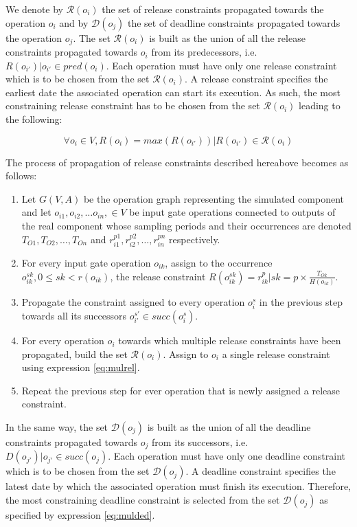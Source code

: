 We denote by $\mathcal{R}(o_i)$ the set of release constraints propagated towards the operation $o_i$ and by $\mathcal{D}(o_j)$ the set of deadline constraints propagated towards the operation $o_j$. The set $\mathcal{R}(o_i)$ is built as the union of all the release constraints propagated towards $o_i$ from its predecessors, i.e. $R(o_{i'}) | o_{i'} \in pred(o_i)$. Each operation must have only one release constraint which is to be chosen from the set $\mathcal{R}(o_i)$. A release constraint specifies the earliest date the associated operation can start its execution. As such, the most constraining release constraint has to be chosen from the set $\mathcal{R}(o_i)$ leading to the following:

\begin{equation}
\forall o_i \in V, R(o_i) = max(R(o_{i'})) | R(o_{i'}) \in \mathcal{R}(o_i)
\label{eq:mulrel}
\end{equation}

The process of propagation of release constraints described hereabove becomes as follows:

\begin{enumerate}
\item Let $G(V,A)$ be the operation graph representing the simulated component and let $o_{i1}, o_{i2}, \ldots o_{in},\in  V$ be input gate operations connected to outputs of the real component whose sampling periods and their occurrences are denoted $T_{O1}, T_{O2}, \ldots, T_{On}$ and $r_{i1}^{p1}, r_{i2}^{p2}, \ldots, r_{in}^{pn}$ respectively.
\item For every input gate operation $o_{ik}$, assign to the occurrence $o_{ik}^{sk}, 0 \leq sk < r(o_{ik})$, the release constraint $R(o_{ik}^{sk}) = r_{ik}^p | sk = p \times \frac{T_{Ok}}{H(o_{ik})}$.
\item Propagate the constraint assigned to every operation $o_i^s$ in the previous step towards all its successors $o_{i'}^{s'} \in succ(o_i^s)$.
\item For every operation $o_i$ towards which multiple release constraints have been propagated, build the set $\mathcal{R}(o_i)$. Assign to $o_i$ a single release constraint using expression \ref{eq:mulrel}.
\item Repeat the previous step for ever operation that is newly assigned a release constraint.
\end{enumerate}

In the same way, the set $\mathcal{D}(o_j)$ is built as the union of all the deadline constraints propagated towards $o_j$ from its successors, i.e. $D(o_{j'}) | o_{j'} \in succ(o_j)$. Each operation must have only one deadline constraint which is to be chosen from the set $\mathcal{D}(o_j)$. A deadline constraint specifies the latest date by which the associated operation must finish its execution. Therefore, the most constraining deadline constraint is selected from the set $\mathcal{D}(o_j)$ as specified by expression \ref{eq:mulded}.

